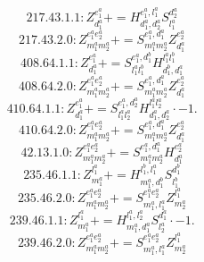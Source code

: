 \documentclass[letterpaper,10pt,fleqn,leqno,onecolumn]{article}
\begin{document}
\begin{equation} \;\;\;\;\;\;  217.43.1.1: Z^{e_{1}^{a}}_{d_{1}^{a}}+=H^{e_{1}^{a},l_{1}^{a}}_{d_{1}^{a},d_{2}^{a}}S^{d_{2}^{a}}_{l_{1}^{a}} \end{equation}
\begin{equation} \;\;\;\;\;\;  217.43.2.0: Z^{e_{1}^{a}e_{2}^{a}}_{m_{1}^{a}m_{2}^{a}}+=S^{e_{1}^{a},d_{1}^{a}}_{m_{1}^{a}m_{2}^{a}}Z^{e_{2}^{a}}_{d_{1}^{a}} \end{equation}
\begin{equation} \;\;\;\;\;\;  408.64.1.1: Z^{e_{1}^{a}}_{d_{1}^{a}}+=S^{e_{1}^{a},d_{1}^{b}}_{l_{1}^{a}l_{1}^{b}}H^{l_{1}^{a}l_{1}^{b}}_{d_{1}^{b},d_{1}^{a}} \end{equation}
\begin{equation} \;\;\;\;\;\;  408.64.2.0: Z^{e_{1}^{a}e_{2}^{a}}_{m_{1}^{a}m_{2}^{a}}+=S^{e_{1}^{a},d_{1}^{a}}_{m_{1}^{a}m_{2}^{a}}Z^{e_{2}^{a}}_{d_{1}^{a}} \end{equation}
\begin{equation} \;\;\;\;\;\;  410.64.1.1: Z^{e_{1}^{a}}_{d_{1}^{a}}+=S^{e_{1}^{a},d_{2}^{a}}_{l_{1}^{a}l_{2}^{a}}H^{l_{1}^{a}l_{2}^{a}}_{d_{1}^{a},d_{2}^{a}}\cdot -1. \end{equation}
\begin{equation} \;\;\;\;\;\;  410.64.2.0: Z^{e_{1}^{a}e_{2}^{a}}_{m_{1}^{a}m_{2}^{a}}+=S^{e_{1}^{a},d_{1}^{a}}_{m_{1}^{a}m_{2}^{a}}Z^{e_{2}^{a}}_{d_{1}^{a}} \end{equation}
\begin{equation} \;\;\;\;\;\;  42.13.1.0: Z^{e_{1}^{a}e_{2}^{a}}_{m_{1}^{a}m_{2}^{a}}+=S^{e_{1}^{a},d_{1}^{a}}_{m_{1}^{a}m_{2}^{a}}H^{e_{2}^{a}}_{d_{1}^{a}} \end{equation}
\begin{equation} \;\;\;\;\;\;  235.46.1.1: Z^{l_{1}^{a}}_{m_{1}^{a}}+=H^{l_{1}^{b},l_{1}^{a}}_{m_{1}^{a},d_{1}^{b}}S^{d_{1}^{b}}_{l_{1}^{b}} \end{equation}
\begin{equation} \;\;\;\;\;\;  235.46.2.0: Z^{e_{1}^{a}e_{2}^{a}}_{m_{1}^{a}m_{2}^{a}}+=S^{e_{1}^{a}e_{2}^{a}}_{m_{1}^{a},l_{1}^{a}}Z^{l_{1}^{a}}_{m_{2}^{a}} \end{equation}
\begin{equation} \;\;\;\;\;\;  239.46.1.1: Z^{l_{1}^{a}}_{m_{1}^{a}}+=H^{l_{1}^{a},l_{2}^{a}}_{m_{1}^{a},d_{1}^{a}}S^{d_{1}^{a}}_{l_{2}^{a}}\cdot -1. \end{equation}
\begin{equation} \;\;\;\;\;\;  239.46.2.0: Z^{e_{1}^{a}e_{2}^{a}}_{m_{1}^{a}m_{2}^{a}}+=S^{e_{1}^{a}e_{2}^{a}}_{m_{1}^{a},l_{1}^{a}}Z^{l_{1}^{a}}_{m_{2}^{a}} \end{equation}
\end{document}
